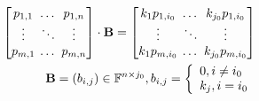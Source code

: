 \documentclass[12pt]{extbook}
\begin{document}
\begin{equation}
    \label{eq:spec_mat}
    \begin{aligned}
        \setlength{\arraycolsep}{2pt}
        \begin{bmatrix} 
            p_{1, 1}    & \dots     & p_{1, n}  \\
            \vdots      & \ddots    & \vdots    \\
            p_{m, 1}    & \dots     & p_{m, n} 
        \end{bmatrix}
        \cdot
        \textbf{B}
        =
        \begin{bmatrix}
            k_1 p_{1, i_0}  & \dots     & k_{j_0} p_{1, i_0}    \\
            \vdots          & \ddots    & \vdots                \\
            k_1 p_{m, i_0}  & \dots     & k_{j_0} p_{m, i_0}    \\
        \end{bmatrix} \\
        \textbf{B} = (b_{i, j}) \in \mathbb{F}^{n \times j_0}, 
        b_{i, j} = \left\{
                        \begin{array}{lc}
                            0, i \neq i_{0} \\
                            k_j, i = i_{0}
                        \end{array}
                    \right.
    \end{aligned}
    \end{equation}
\end{document}
